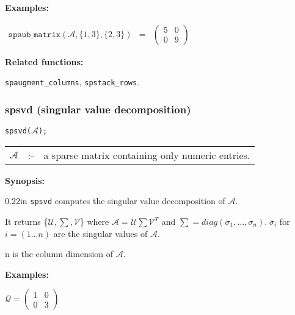 \textbf{Examples:}

\begin{flushleft}  
\hspace*{0.1in}
\begin{math}  
\begin{array}{ccc}
\texttt{spsub\_matrix}(\mathcal{A},\{1,3\},\{2,3\}) & = & 
        \left( \begin{array}{cc} 5 & 0\\ 0 & 9
 \end{array} \right) 
\end{array}
\end{math}  
\end{flushleft}

\textbf{Related functions:}

\hspace*{0.175in} \texttt{spaugment\_columns}, \texttt{spstack\_rows}.


\subsubsection{spsvd (singular value decomposition)}

\hspace*{0.175in} \texttt{spsvd($\mathcal{A}$);}

\hspace*{0.1in}  
\begin{tabular}{l l l} 
$\mathcal{A}$ &:-& a sparse matrix containing only numeric entries.
\end{tabular}

\textbf{Synopsis:} %

\begin{addtolength}{\leftskip}{0.22in}
\texttt{spsvd} computes the singular value decomposition of $\mathcal{A}$. 

It returns \{$\mathcal{U},\sum,\mathcal{V}$\} where $\mathcal{A} = \mathcal{U} 
\sum \mathcal{V}^T$ and $\sum = diag(\sigma_{1}, \ldots ,\sigma_{n}). \; 
\sigma_{i}$ for $i= (1 \ldots n)$ are the singular values of $\mathcal{A}$.
 

n is the column dimension of $\mathcal{A}$.

\end{addtolength}

\textbf{Examples:}

\begin{flushleft}
\hspace*{0.175in}
\begin{math}  
\mathcal{Q} = \left( \begin{array}{cc} 1 & 0 \\ 0 & 3 
\end{array} \right)
\end{math}  
\end{flushleft}

